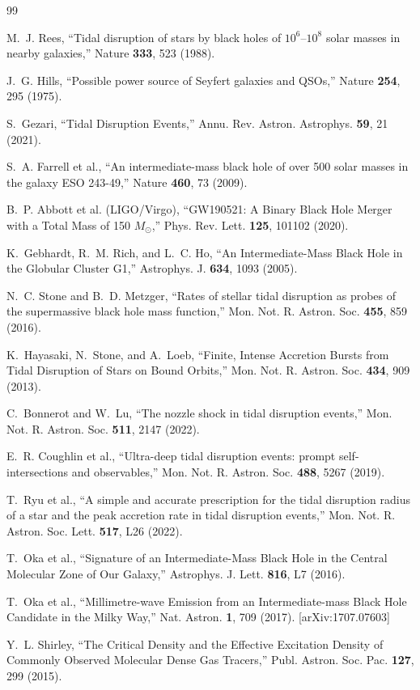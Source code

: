 \documentclass[twocolumn,amsmath,amssymb,prd,superscriptaddress,nofootinbib]{revtex4-2}
\begin{document}
\begin{thebibliography}{99}

M.~J. Rees,
``Tidal disruption of stars by black holes of $10^6$--$10^8$ solar masses in nearby galaxies,''
Nature \textbf{333}, 523 (1988).

J.~G. Hills,
``Possible power source of Seyfert galaxies and QSOs,''
Nature \textbf{254}, 295 (1975).

S.~Gezari,
``Tidal Disruption Events,''
Annu. Rev. Astron. Astrophys. \textbf{59}, 21 (2021).

S.~A. Farrell et al.,
``An intermediate-mass black hole of over 500 solar masses in the galaxy ESO 243-49,''
Nature \textbf{460}, 73 (2009).

B.~P. Abbott et al. (LIGO/Virgo),
``GW190521: A Binary Black Hole Merger with a Total Mass of 150 $M_\odot$,''
Phys. Rev. Lett. \textbf{125}, 101102 (2020).

K.~Gebhardt, R.~M. Rich, and L.~C. Ho,
``An Intermediate-Mass Black Hole in the Globular Cluster G1,''
Astrophys. J. \textbf{634}, 1093 (2005).

N.~C. Stone and B.~D. Metzger,
``Rates of stellar tidal disruption as probes of the supermassive black hole mass function,''
Mon. Not. R. Astron. Soc. \textbf{455}, 859 (2016).

K.~Hayasaki, N.~Stone, and A.~Loeb,
``Finite, Intense Accretion Bursts from Tidal Disruption of Stars on Bound Orbits,''
Mon. Not. R. Astron. Soc. \textbf{434}, 909 (2013).

C.~Bonnerot and W.~Lu,
``The nozzle shock in tidal disruption events,''
Mon. Not. R. Astron. Soc. \textbf{511}, 2147 (2022).

E.~R. Coughlin et al.,
``Ultra-deep tidal disruption events: prompt self-intersections and observables,''
Mon. Not. R. Astron. Soc. \textbf{488}, 5267 (2019).

T.~Ryu et al.,
``A simple and accurate prescription for the tidal disruption radius of a star and the peak accretion rate in tidal disruption events,''
Mon. Not. R. Astron. Soc. Lett. \textbf{517}, L26 (2022).

T.~Oka et al.,
``Signature of an Intermediate-Mass Black Hole in the Central Molecular Zone of Our Galaxy,''
Astrophys. J. Lett. \textbf{816}, L7 (2016).

T.~Oka et al.,
``Millimetre-wave Emission from an Intermediate-mass Black Hole Candidate in the Milky Way,''
Nat. Astron. \textbf{1}, 709 (2017).
[arXiv:1707.07603]

Y.~L. Shirley,
``The Critical Density and the Effective Excitation Density of Commonly Observed Molecular Dense Gas Tracers,''
Publ. Astron. Soc. Pac. \textbf{127}, 299 (2015).

\end{thebibliography}
\end{document}
